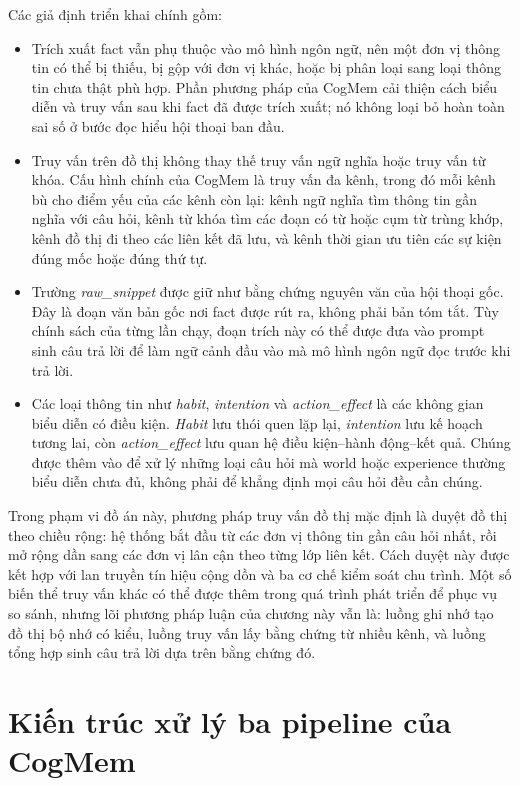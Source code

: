 \documentclass[../main.tex]{subfiles}
\begin{document}
Các giả định triển khai chính gồm:

\begin{itemize}
    \item Trích xuất fact vẫn phụ thuộc vào mô hình ngôn ngữ, nên một đơn vị thông tin có thể bị thiếu, bị gộp với đơn vị khác, hoặc bị phân loại sang loại thông tin chưa thật phù hợp. Phần phương pháp của CogMem cải thiện cách biểu diễn và truy vấn sau khi fact đã được trích xuất; nó không loại bỏ hoàn toàn sai số ở bước đọc hiểu hội thoại ban đầu.
    \item Truy vấn trên đồ thị không thay thế truy vấn ngữ nghĩa hoặc truy vấn từ khóa. Cấu hình chính của CogMem là truy vấn đa kênh, trong đó mỗi kênh bù cho điểm yếu của các kênh còn lại: kênh ngữ nghĩa tìm thông tin gần nghĩa với câu hỏi, kênh từ khóa tìm các đoạn có từ hoặc cụm từ trùng khớp, kênh đồ thị đi theo các liên kết đã lưu, và kênh thời gian ưu tiên các sự kiện đúng mốc hoặc đúng thứ tự.
    \item Trường \textit{raw\_snippet} được giữ như bằng chứng nguyên văn của hội thoại gốc. Đây là đoạn văn bản gốc nơi fact được rút ra, không phải bản tóm tắt. Tùy chính sách của từng lần chạy, đoạn trích này có thể được đưa vào prompt sinh câu trả lời để làm ngữ cảnh đầu vào mà mô hình ngôn ngữ đọc trước khi trả lời.
    \item Các loại thông tin như \textit{habit}, \textit{intention} và \textit{action\_effect} là các không gian biểu diễn có điều kiện. \textit{Habit} lưu thói quen lặp lại, \textit{intention} lưu kế hoạch tương lai, còn \textit{action\_effect} lưu quan hệ điều kiện--hành động--kết quả. Chúng được thêm vào để xử lý những loại câu hỏi mà world hoặc experience thường biểu diễn chưa đủ, không phải để khẳng định mọi câu hỏi đều cần chúng.
\end{itemize}

Trong phạm vi đồ án này, phương pháp truy vấn đồ thị mặc định là duyệt đồ thị theo chiều rộng: hệ thống bắt đầu từ các đơn vị thông tin gần câu hỏi nhất, rồi mở rộng dần sang các đơn vị lân cận theo từng lớp liên kết. Cách duyệt này được kết hợp với lan truyền tín hiệu cộng dồn và ba cơ chế kiểm soát chu trình. Một số biến thể truy vấn khác có thể được thêm trong quá trình phát triển để phục vụ so sánh, nhưng lõi phương pháp luận của chương này vẫn là: luồng ghi nhớ tạo đồ thị bộ nhớ có kiểu, luồng truy vấn lấy bằng chứng từ nhiều kênh, và luồng tổng hợp sinh câu trả lời dựa trên bằng chứng đó.

\section{Kiến trúc xử lý ba pipeline của CogMem}
\end{document}
